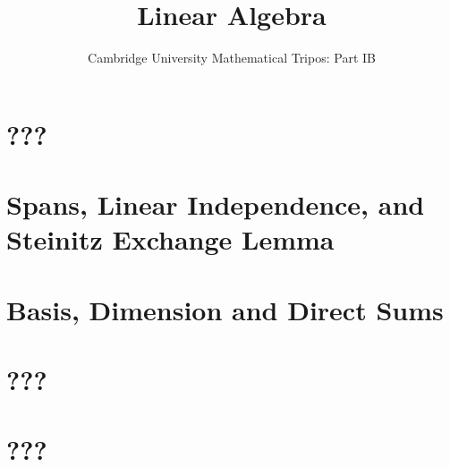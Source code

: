 \documentclass{article}
\title{Linear Algebra}
\author{Cambridge University Mathematical Tripos: Part IB}
\begin{document}
\maketitle

\tableofcontentsnewpage{}

\section{???}

\section{Spans, Linear Independence, and Steinitz Exchange Lemma}

\section{Basis, Dimension and Direct Sums}

\section{???}

\section{???}

\end{document}
